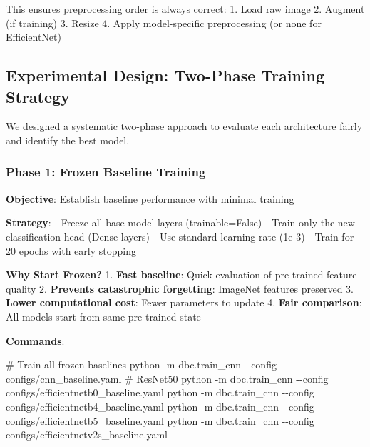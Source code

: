 \documentclass[
  letterpaper,
  DIV=11,
  numbers=noendperiod]{scrartcl}
\newenvironment{Shaded}{\begin{snugshade}}{\end{snugshade}}
\newcommand{\AttributeTok}[1]{\textcolor[rgb]{0.40,0.45,0.13}{#1}}
\newcommand{\CommentTok}[1]{\textcolor[rgb]{0.37,0.37,0.37}{#1}}
\newcommand{\ExtensionTok}[1]{\textcolor[rgb]{0.00,0.23,0.31}{#1}}
\newcommand{\NormalTok}[1]{\textcolor[rgb]{0.00,0.23,0.31}{#1}}
\renewenvironment{Shaded}{%
  \begin{tcolorbox}[%
    enhanced,%
    colback=codebg,%
    colframe=codebg,%
    borderline west={3pt}{0pt}{sectionblue},%
    boxrule=0pt,%
    arc=0pt,%
    boxsep=5pt,%
    left=2mm,%
    right=2mm,%
    top=2mm,%
    bottom=2mm%
  ]%
}{%
  \end{tcolorbox}%
}
\begin{document}
This ensures preprocessing order is always correct: 1. Load raw image 2.
Augment (if training) 3. Resize 4. Apply model-specific preprocessing
(or none for EfficientNet)

\subsection{Experimental Design: Two-Phase Training
Strategy}\label{experimental-design-two-phase-training-strategy}

We designed a systematic two-phase approach to evaluate each
architecture fairly and identify the best model.

\subsubsection{Phase 1: Frozen Baseline
Training}\label{phase-1-frozen-baseline-training}

\textbf{Objective}: Establish baseline performance with minimal training

\textbf{Strategy}: - Freeze all base model layers (trainable=False) -
Train only the new classification head (Dense layers) - Use standard
learning rate (1e-3) - Train for 20 epochs with early stopping

\textbf{Why Start Frozen?} 1. \textbf{Fast baseline}: Quick evaluation
of pre-trained feature quality 2. \textbf{Prevents catastrophic
forgetting}: ImageNet features preserved 3. \textbf{Lower computational
cost}: Fewer parameters to update 4. \textbf{Fair comparison}: All
models start from same pre-trained state

\textbf{Commands}:

\begin{Shaded}
\begin{Highlighting}[]
\CommentTok{\# Train all frozen baselines}
\ExtensionTok{python} \AttributeTok{{-}m}\NormalTok{ dbc.train\_cnn }\AttributeTok{{-}{-}config}\NormalTok{ configs/cnn\_baseline.yaml           }\CommentTok{\# ResNet50}
\ExtensionTok{python} \AttributeTok{{-}m}\NormalTok{ dbc.train\_cnn }\AttributeTok{{-}{-}config}\NormalTok{ configs/efficientnetb0\_baseline.yaml}
\ExtensionTok{python} \AttributeTok{{-}m}\NormalTok{ dbc.train\_cnn }\AttributeTok{{-}{-}config}\NormalTok{ configs/efficientnetb4\_baseline.yaml}
\ExtensionTok{python} \AttributeTok{{-}m}\NormalTok{ dbc.train\_cnn }\AttributeTok{{-}{-}config}\NormalTok{ configs/efficientnetb5\_baseline.yaml}
\ExtensionTok{python} \AttributeTok{{-}m}\NormalTok{ dbc.train\_cnn }\AttributeTok{{-}{-}config}\NormalTok{ configs/efficientnetv2s\_baseline.yaml}
\end{Highlighting}
\end{Shaded}
\end{document}
